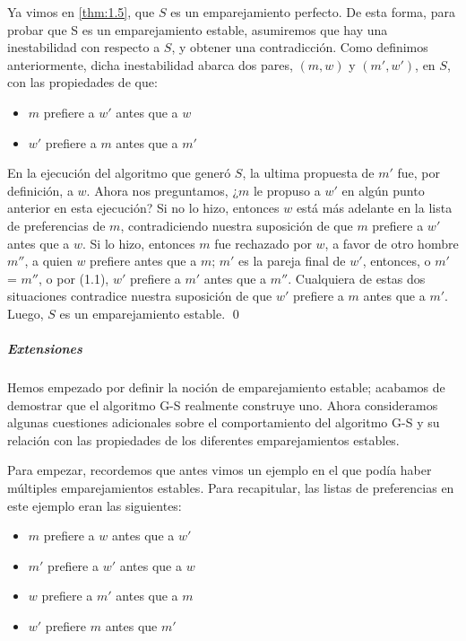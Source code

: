 \documentclass[a4paper, 12pt]{book}
\theoremstyle{dotless}
\renewenvironment{proof}{\vspace{12pt}{\noindent\bfseries Demostración.}}{\qed\vspace{12pt}}
\begin{document}
\begin{proof}
Ya vimos en \ref{thm:1.5}, que $S$ es un emparejamiento perfecto. De esta forma, para probar que S es un emparejamiento estable, asumiremos que hay una inestabilidad con respecto a $S$, y obtener una contradicción. Como definimos anteriormente, dicha inestabilidad abarca dos pares, $(m,w)$ y $(m',w')$, en $S$, con las propiedades de que:

\begin{itemize}
    \itemsep0em
    \item $m$ prefiere a $w'$ antes que a $w$ 
    \item $w'$ prefiere a $m$ antes que a $m'$
\end{itemize}
    
En la ejecución del algoritmo que generó $S$, la ultima propuesta de $m'$ fue, por definición, a $w$. Ahora nos preguntamos, ¿$m$ le propuso a $w'$ en algún punto anterior en esta ejecución? Si no lo hizo, entonces $w$ está más adelante en la lista de preferencias de $m$, contradiciendo nuestra suposición de que $m$ prefiere a $w'$ antes que a $w$. Si lo hizo, entonces $m$ fue rechazado por $w$, a favor de otro hombre $m''$, a quien $w$ prefiere antes que a $m$; $m'$ es la pareja final de $w'$, entonces, o $m'$ = $m''$, o por (1.1), $w'$ prefiere a $m'$ antes que a $m''$. Cualquiera de estas dos situaciones contradice nuestra suposición de que $w'$ prefiere a $m$ antes que a $m'$. Luego, $S$ es un emparejamiento estable. 
\end{proof} 

\subparagraph{Extensiones}

Hemos empezado por definir la noción de emparejamiento estable; acabamos de demostrar que el algoritmo G-S realmente construye uno. Ahora consideramos algunas cuestiones adicionales sobre el comportamiento del algoritmo G-S y su relación con las propiedades de los diferentes emparejamientos estables.

Para empezar, recordemos que antes vimos un ejemplo en el que podía haber múltiples emparejamientos estables. Para recapitular, las listas de preferencias en este ejemplo eran las siguientes:

\begin{itemize}
    \itemsep0em
    \item $m$ prefiere a $w$ antes que a $w'$
    \item $m'$ prefiere a $w'$ antes que a $w$
    \item $w$ prefiere a $m'$ antes que a $m$
    \item $w'$ prefiere $m$ antes que $m'$
\end{itemize}
\end{document}
